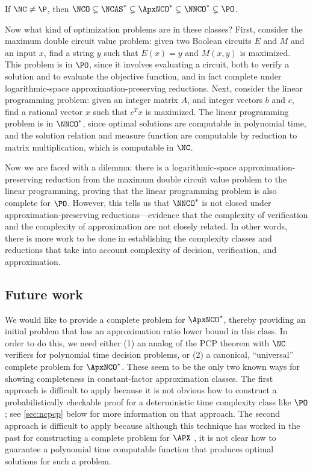 \documentclass{article}
\newcommand{\todo}[1]{\textbf{TODO #1}}
\begin{document}
\begin{theorem}  %
  If $\NC \neq \P$, then
    $\NCO \subsetneq \NCAS^* \subsetneq \ApxNCO^* \subsetneq \NNCO^* \subsetneq \PO$.
\end{theorem}

Now what kind of optimization problems are in these classes?
First, consider the maximum double circuit value problem: given two Boolean circuits $E$ and $M$ and an input $x$, find a string $y$ such that $E(x) = y$ and $M(x, y)$ is maximized.
This problem is in $\PO$, since it involves evaluating a circuit, both to verify a solution and to evaluate the objective function, and in fact complete under logarithmic-space approximation-preserving reductions.
Next, consider the linear programming problem: given an integer matrix $A$, and integer vectors $b$ and $c$, find a rational vector $x$ such that $c^T x$ is maximized.
The linear programming problem is in $\NNCO^*$, since optimal solutions are computable in polynomial time, and the solution relation and measure function are computable by reduction to matrix multiplication, which is computable in $\NC$.

Now we are faced with a dilemma: there is a logarithmic-space approximation-preserving reduction from the maximum double circuit value problem to the linear programming, proving that the linear programming problem is also complete for $\PO$.
However, this tells us that $\NNCO^*$ is not closed under approximation-preserving reductions---evidence that the complexity of verification and the complexity of approximation are not closely related.
In other words, there is more work to be done in establishing the complexity classes and reductions that take into account complexity of decision, verification, and approximation.

\subsection{Future work}
\label{sec:fut}

We would like to provide a complete problem for $\ApxNCO^*$, thereby providing an initial problem that has an approximation ratio lower bound in this class.
In order to do this, we need either (1) an analog of the PCP theorem with $\NC$ verifiers for polynomial time decision problems, or (2) a canonical, ``universal'' complete problem for $\ApxNCO^*$.
These seem to be the only two known ways for showing completeness in constant-factor approximation classes.
The first approach is difficult to apply because it is not obvious how to construct a probabilistically checkable proof for a deterministic time complexity class like $\PO$; see \autoref{sec:ncpcp} below for more information on that approach.
The second approach is difficult to apply because although this technique has worked in the past for constructing a complete problem for $\APX$ \autocite[Lemma~2]{cp91}, it is not clear how to guarantee a polynomial time computable function that produces optimal solutions for such a problem.
\end{document}
